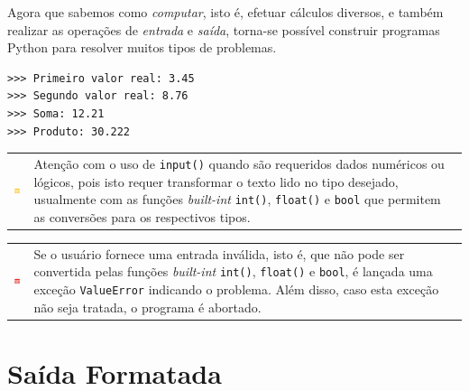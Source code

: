 \documentclass[
]{book}
\begin{document}
Agora que sabemos como \emph{computar}, isto é, efetuar cálculos diversos, e também realizar as operações de \emph{entrada} e \emph{saída}, torna-se possível construir programas Python para resolver muitos tipos de problemas.

\begin{verbatim}
>>> Primeiro valor real: 3.45
>>> Segundo valor real: 8.76
>>> Soma: 12.21
>>> Produto: 30.222
\end{verbatim}

\begin{longtable}[]{@{}
  >{\centering\arraybackslash}p{}
  >{\raggedright\arraybackslash}p{}@{}}
\toprule
& \\
\midrule
\endhead
\includegraphics{images/application-yellow.png} & Atenção com o uso de \texttt{input()} quando são requeridos dados numéricos ou lógicos, pois isto requer transformar o texto lido no tipo desejado, usualmente com as funções \emph{built-int} \texttt{int()}, \texttt{float()} e \texttt{bool} que permitem as conversões para os respectivos tipos. \\
\bottomrule
\end{longtable}

\begin{longtable}[]{@{}
  >{\centering\arraybackslash}p{}
  >{\raggedright\arraybackslash}p{}@{}}
\toprule
& \\
\midrule
\endhead
\includegraphics{images/application-red.png} & Se o usuário fornece uma entrada inválida, isto é, que não pode ser convertida pelas funções \emph{built-int} \texttt{int()}, \texttt{float()} e \texttt{bool}, é lançada uma exceção \texttt{ValueError} indicando o problema. Além disso, caso esta exceção não seja tratada, o programa é abortado. \\
\bottomrule
\end{longtable}

\hypertarget{e-s-format}{%
\section{Saída Formatada}\label{e-s-format}}
\end{document}
